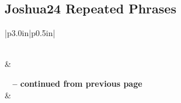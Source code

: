 \subsection{Joshua24 Repeated Phrases}


\normalsize
 
\begin{center}
\begin{longtable}{|p{3.0in}|p{0.5in}|}
\caption[Joshua24 Repeated Phrases]{Joshua24 Repeated Phrases}\label{table:Repeated Phrases Joshua24} \\
\hline {} &  \\ \hline 
\endfirsthead
 
{{\bfseries \tablename\ \thetable{} -- continued from previous page}} \\  
\hline {} &  \\ \hline 
\endhead
 

\end{longtable}
\end{center}
